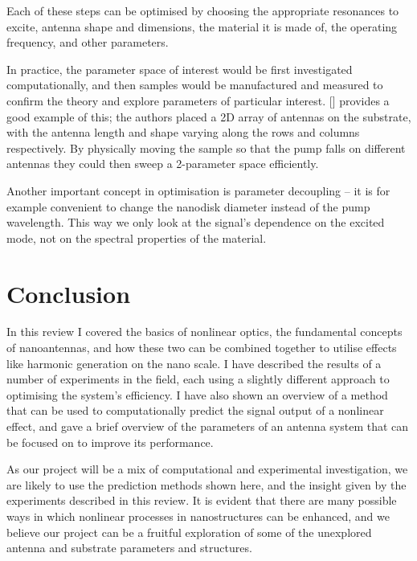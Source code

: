 \documentclass[12pt,a4paper]{article}
\newcommand{\citein}[1]{[\citen{#1}]}
\begin{document}
Each of these steps can be optimised by choosing the appropriate resonances to excite, antenna shape and dimensions, the material it is made of, the operating frequency, and other parameters.

In practice, the parameter space of interest would be first investigated computationally, and then samples would be manufactured and measured to confirm the theory and explore parameters of particular interest. \citein{obrienPredictingNonlinearProperties2015} provides a good example of this; the authors placed a 2D array of antennas on the substrate, with the antenna length and shape varying along the rows and columns respectively. By physically moving the sample so that the pump falls on different antennas they could then sweep a 2-parameter space efficiently.

Another important concept in optimisation is parameter decoupling -- it is for example convenient
to change the nanodisk diameter instead of the pump wavelength\cite{obrienPredictingNonlinearProperties2015, grinblatEnhancedThirdHarmonic2016}. This way we only look at the signal's dependence on the excited mode, not on the spectral properties of the material.

\section{Conclusion}
In this review I covered the basics of nonlinear optics, the fundamental concepts of nanoantennas, and how these two can be combined together to utilise effects like harmonic generation on the nano scale. I have described the results of a number of experiments in the field, each using a slightly different approach to optimising the system's efficiency. I have also shown an overview of a method that can be used to computationally predict the signal output of a nonlinear effect, and gave a brief overview of the parameters of an antenna system that can be focused on to improve its performance.

As our project will be a mix of computational and experimental investigation, we are likely to use the prediction methods shown here, and the insight given by the experiments described in this review. It is evident that there are many possible ways in which nonlinear processes in nanostructures can be enhanced, and we believe our project can be a fruitful exploration of some of the unexplored antenna and substrate parameters and structures.




\end{document}
